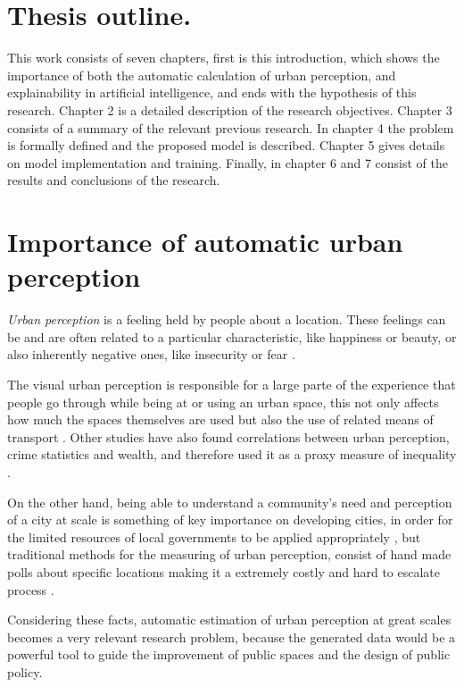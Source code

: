 \section{Thesis outline.}
This work consists of seven chapters, first is this introduction, which
shows the  importance of both the automatic calculation of urban perception, and
explainability in artificial intelligence, and ends with the hypothesis
of this research. Chapter 2 is a detailed description of the research objectives.
Chapter 3 consists of a summary of the relevant previous research. In chapter 4
the problem is formally defined and the proposed model is described. Chapter 5 gives
details on model implementation and training. Finally, in chapter 6 and 7 consist of the results and
conclusions of the research.

\section{Importance of automatic urban perception}

\textit{Urban perception} is a feeling held by people about a location. These feelings can be and
are often related to a particular characteristic, like happiness or beauty, or also
inherently negative ones, like insecurity or fear \cite{tamara_judgments}.

The visual urban perception is  responsible for a large parte of the experience that people
go through while  being at or using an urban space, this not only affects how much the spaces
themselves are used \cite{khisty} but also the use of related means of transport \cite{antonakos}.
Other studies have also found correlations between urban perception, crime statistics \cite{tamara_judgments}
and wealth, and therefore used it as a proxy measure of inequality \cite{tamara_judgments,hidalgo_inequality, rossetti}.

On the other hand, being able to understand a community's need and perception of a city at scale is something
of key importance on developing cities, in order for the limited  resources of local governments to be applied
appropriately \cite{santani}, but traditional methods for the measuring of urban perception, consist of hand made polls
about specific locations making it a extremely costly and hard to escalate process \cite{clifton}.

Considering these facts, automatic estimation of urban perception at great scales becomes a very relevant
research problem, because the generated data would be a powerful tool to guide the improvement of
public spaces and the design of public policy.

